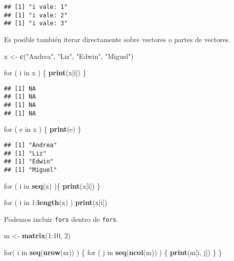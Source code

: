 \documentclass[]{article}
\newenvironment{Shaded}{\begin{snugshade}}{\end{snugshade}}
\newcommand{\KeywordTok}[1]{\textcolor[rgb]{0.13,0.29,0.53}{\textbf{{#1}}}}
\newcommand{\DecValTok}[1]{\textcolor[rgb]{0.00,0.00,0.81}{{#1}}}
\newcommand{\StringTok}[1]{\textcolor[rgb]{0.31,0.60,0.02}{{#1}}}
\newcommand{\NormalTok}[1]{{#1}}
\begin{document}
\begin{verbatim}
## [1] "i vale: 1"
## [1] "i vale: 2"
## [1] "i vale: 3"
\end{verbatim}

Es posible también iterar directamente sobre vectores o partes de
vectores.

\begin{Shaded}
\begin{Highlighting}[]
\NormalTok{x <-}\StringTok{ }\KeywordTok{c}\NormalTok{(}\StringTok{"Andrea"}\NormalTok{, }\StringTok{"Liz"}\NormalTok{, }\StringTok{"Edwin"}\NormalTok{, }\StringTok{"Miguel"}\NormalTok{)}

\NormalTok{for ( i in x ) \{}
  \KeywordTok{print}\NormalTok{(x[i])}
\NormalTok{\}}
\end{Highlighting}
\end{Shaded}

\begin{verbatim}
## [1] NA
## [1] NA
## [1] NA
## [1] NA
\end{verbatim}

\begin{Shaded}
\begin{Highlighting}[]
\NormalTok{for ( e in x ) \{}
  \KeywordTok{print}\NormalTok{(e)}
\NormalTok{\}}
\end{Highlighting}
\end{Shaded}

\begin{verbatim}
## [1] "Andrea"
## [1] "Liz"
## [1] "Edwin"
## [1] "Miguel"
\end{verbatim}

\begin{Shaded}
\begin{Highlighting}[]
\NormalTok{for ( i in }\KeywordTok{seq}\NormalTok{(x) )\{}
  \KeywordTok{print}\NormalTok{(x[i])}
\NormalTok{\}}

\NormalTok{for ( i in }\DecValTok{1}\NormalTok{:}\KeywordTok{length}\NormalTok{(x) ) }\KeywordTok{print}\NormalTok{(x[i])}
\end{Highlighting}
\end{Shaded}

Podemos incluir \texttt{fors} dentro de \texttt{fors}.

\begin{Shaded}
\begin{Highlighting}[]
\NormalTok{m <-}\StringTok{ }\KeywordTok{matrix}\NormalTok{(}\DecValTok{1}\NormalTok{:}\DecValTok{10}\NormalTok{, }\DecValTok{2}\NormalTok{)}

\NormalTok{for( i in }\KeywordTok{seq}\NormalTok{(}\KeywordTok{nrow}\NormalTok{(m)) ) \{}
  \NormalTok{for ( j in }\KeywordTok{seq}\NormalTok{(}\KeywordTok{ncol}\NormalTok{(m)) ) \{}
    \KeywordTok{print}\NormalTok{(m[i, j])}
  \NormalTok{\}}
\NormalTok{\}}
\end{Highlighting}
\end{Shaded}
\end{document}
